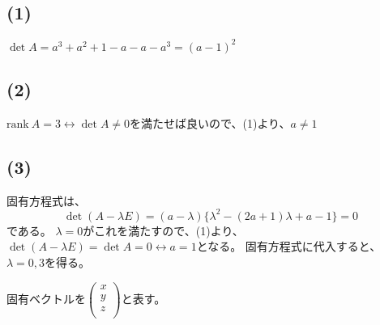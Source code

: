 \documentclass[]{jsarticle}
\begin{document}
    \subsection*{(1)}
        $\det A = a^3+ a^2 + 1 - a - a - a^3 = (a - 1)^2$
    \subsection*{(2)}
        $\mathrm{rank} \ A = 3 \leftrightarrow \det A \neq 0$を満たせば良いので、(1)より、$a \neq 1$
    \subsection*{(3)}
        固有方程式は、
        \begin{equation}
            \det (A - \lambda E) = (a - \lambda)\{\lambda^2 -(2a + 1)\lambda + a - 1\} = 0 \label{equ:char}
        \end{equation}
        である。
        $\lambda = 0$がこれを満たすので、(1)より、$\det (A - \lambda E) = \det A = 0 \leftrightarrow a = 1$となる。
        固有方程式に代入すると、$\lambda = 0, 3$を得る。

        固有ベクトルを$
        \begin{pmatrix}
            x \\
            y \\
            z \\
        \end{pmatrix}
        $と表す。
\end{document}
